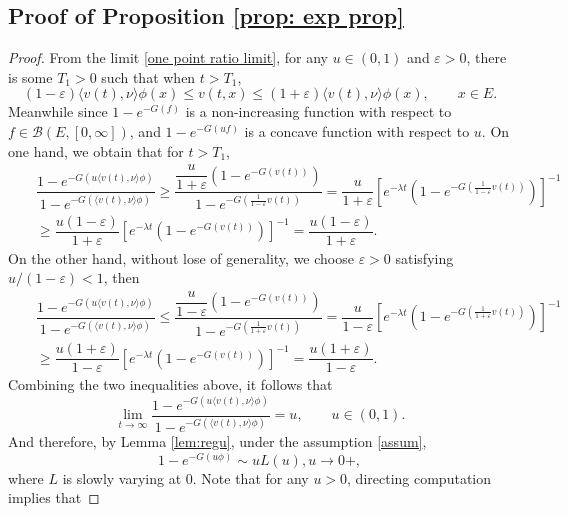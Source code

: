\documentclass[12pt,a4paper]{amsart}
\numberwithin{equation}{section}
\theoremstyle{plain}
\theoremstyle{definition}
\theoremstyle{remark}
\begin{document}
\subsection{Proof of Proposition \ref{prop: exp prop}}
\begin{proof}
From the limit \eqref{one point ratio limit}, for any $u\in (0,1)$ and $\varepsilon>0$, there is some $T_1>0$ such that when $t>T_1$,
\[
(1-\varepsilon)\langle v(t),\nu\rangle \phi(x)\leq v(t,x)\leq (1+\varepsilon)\langle v(t),\nu\rangle \phi(x),\qquad x\in E.
\]
Meanwhile since $1-e^{-G(f)}$ is a non-increasing function with respect to $f\in \mathcal B(E,[0,\infty])$, and $1-e^{-G(uf)}$ is a concave function with respect to $u$.  On one hand, we obtain that for $t>T_1$,
\begin{eqnarray}\label{lower}
&&\dfrac{1-e^{-G(u\langle v(t),\nu\rangle \phi)}}{1-e^{-G(\langle v(t),\nu\rangle \phi)}}\geq \dfrac{\dfrac{u}{1+\varepsilon}\left(1-e^{-G(v(t))}\right)}{1-e^{-G(\frac{1}{1-\varepsilon} v(t))}}=\dfrac{u}{1+\varepsilon}\left[e^{-\lambda t}\left(1-e^{-G(\frac{1}{1-\varepsilon} v(t))}\right)\right]^{-1}\nonumber\\
&&\geq \dfrac{u(1-\varepsilon)}{1+\varepsilon}\left[e^{-\lambda t}\left(1-e^{-G(v(t))}\right)\right]^{-1}=\dfrac{u(1-\varepsilon)}{1+\varepsilon}.
\end{eqnarray}
On the other hand, without lose of generality, we choose $\varepsilon>0$ satisfying $u/(1-\varepsilon)<1$, then
\begin{eqnarray}\label{upper}
&&\dfrac{1-e^{-G(u\langle v(t),\nu\rangle \phi)}}{1-e^{-G(\langle v(t),\nu\rangle \phi)}}\leq \dfrac{\dfrac{u}{1-\varepsilon}\left(1-e^{-G(v(t))}\right)}{1-e^{-G(\frac{1}{1+\varepsilon} v(t))}}=\dfrac{u}{1-\varepsilon}\left[e^{-\lambda t}\left(1-e^{-G(\frac{1}{1+\varepsilon} v(t))}\right)\right]^{-1}\\
&&\geq \dfrac{u(1+\varepsilon)}{1-\varepsilon}\left[e^{-\lambda t}\left(1-e^{-G(v(t))}\right)\right]^{-1}=\dfrac{u(1+\varepsilon)}{1-\varepsilon}.
\end{eqnarray}
Combining the two inequalities above, it follows that
\[
\lim_{t\to\infty}\dfrac{1-e^{-G(u\langle v(t),\nu\rangle \phi)}}{1-e^{-G(\langle v(t),\nu\rangle \phi)}}=u,\qquad u\in (0,1).
\]
And therefore, by Lemma \ref{lem:regu}, under the assumption \ref{assum},
\begin{equation}\label{eq regu}
1-e^{-G(u\phi)}\sim uL(u), u\rightarrow 0+,
\end{equation}
where $L$ is slowly varying at $0$.  Note that for any $u>0$, directing computation implies that

\end{proof}
\end{document}
